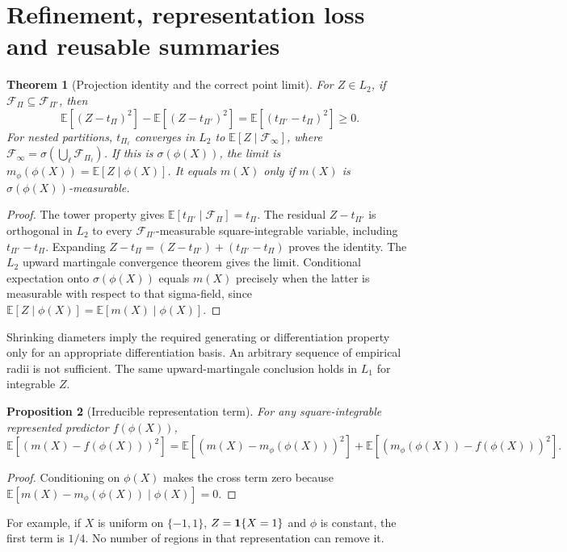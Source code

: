 \documentclass[11pt,a4paper]{article}
\newcommand{\E}{\mathbb E}\newcommand{\Pp}{\mathbb P}
\numberwithin{equation}{section}
\newtheorem{theorem}{Theorem}[section]
\newtheorem{proposition}[theorem]{Proposition}
\theoremstyle{definition}\newtheorem{definition}[theorem]{Definition}
\theoremstyle{remark}\newtheorem{remark}[theorem]{Remark}
\begin{document}
\section{Refinement, representation loss and reusable summaries}\label{sec:projection}
\begin{theorem}[Projection identity and the correct point limit]\label{thm:projection}
For $Z\in L_2$, if $\mathcal F_\Pi\subseteq\mathcal F_{\Pi'}$, then
\[
 \E[(Z-t_\Pi)^2]-\E[(Z-t_{\Pi'})^2]=\E[(t_{\Pi'}-t_\Pi)^2]\ge0.
\]
For nested partitions, $t_{\Pi_\ell}$ converges in $L_2$ to
$\E[Z\mid\mathcal F_\infty]$, where $\mathcal F_\infty=\sigma(\bigcup_\ell\mathcal F_{\Pi_\ell})$.
If this is $\sigma(\phi(X))$, the limit is $m_\phi(\phi(X))=\E[Z\mid\phi(X)]$.
It equals $m(X)$ only if $m(X)$ is $\sigma(\phi(X))$-measurable.
\end{theorem}
\begin{proof}
The tower property gives $\E[t_{\Pi'}\mid\mathcal F_\Pi]=t_\Pi$.
The residual $Z-t_{\Pi'}$ is orthogonal in $L_2$ to every $\mathcal F_{\Pi'}$-measurable square-integrable variable, including $t_{\Pi'}-t_\Pi$. Expanding
$Z-t_\Pi=(Z-t_{\Pi'})+(t_{\Pi'}-t_\Pi)$ proves the identity. The $L_2$ upward martingale convergence theorem gives the limit. Conditional expectation onto $\sigma(\phi(X))$ equals $m(X)$ precisely when the latter is measurable with respect to that sigma-field, since $\E[Z\mid\phi(X)]=\E[m(X)\mid\phi(X)]$.
\end{proof}
Shrinking diameters imply the required generating or differentiation property only for an appropriate differentiation basis. An arbitrary sequence of empirical radii is not sufficient. The same upward-martingale conclusion holds in $L_1$ for integrable $Z$.

\begin{proposition}[Irreducible representation term]\label{prop:representation}
For any square-integrable represented predictor $f(\phi(X))$,
\[
 \E[(m(X)-f(\phi(X)))^2]
 =\E[(m(X)-m_\phi(\phi(X)))^2]
  +\E[(m_\phi(\phi(X))-f(\phi(X)))^2].
\]
\end{proposition}
\begin{proof}
Conditioning on $\phi(X)$ makes the cross term zero because
$\E[m(X)-m_\phi(\phi(X))\mid\phi(X)]=0$.
\end{proof}
For example, if $X$ is uniform on $\{-1,1\}$, $Z=\mathbf 1\{X=1\}$ and $\phi$ is constant, the first term is $1/4$. No number of regions in that representation can remove it.
\end{document}
